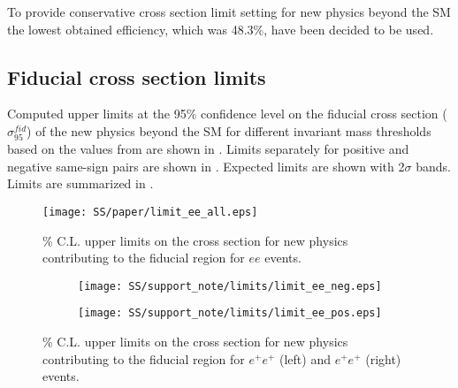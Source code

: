 To provide conservative cross section limit setting for new physics beyond the SM the lowest obtained efficiency, which was 48.3$\%$, have been decided to be used.


\subsection{Fiducial cross section limits}

Computed upper limits at the 95$\%$ confidence level on the fiducial cross section ($\sigma_{95}^{fid}$)
of the new physics beyond the SM for different invariant mass thresholds based on the values from 
are shown in . Limits separately for positive and negative same-sign pairs are shown in .
Expected limits are shown with 2$\sigma$ bands. Limits are summarized in .

\begin{figure}[h]
\begin{center}
\texttt{[image: SS/paper/limit\_ee\_all.eps]}
\caption{\% C.L. upper limits on the cross section for new physics contributing to the fiducial region for $ee$ events.}
\label{fig:inclusive_fid_limit}
\end{center}
\end{figure}


\begin{figure}
\begin{subfigure}{.5\textwidth}
  \centering
  \texttt{[image: SS/support\_note/limits/limit\_ee\_neg.eps]}
\end{subfigure}%
\begin{subfigure}{.5\textwidth}
  \centering
  \texttt{[image: SS/support\_note/limits/limit\_ee\_pos.eps]}
\end{subfigure}
\caption{\% C.L. upper limits on the cross section for new physics contributing to the fiducial region 
for $e^{+}e^{+}$ (left) and $e^{+}e^{+}$ (right) events.}
  \label{fig:signal_kinematics}
\end{figure}



